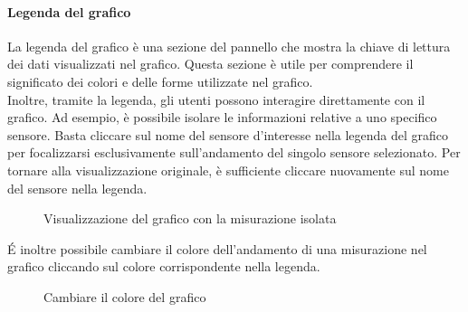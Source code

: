 \paragraph{Legenda del grafico}
La legenda del grafico è una sezione del pannello che mostra la chiave di lettura dei dati visualizzati nel grafico. Questa sezione è utile per comprendere il significato dei colori e delle forme utilizzate nel grafico.\\
Inoltre, tramite la legenda, gli utenti possono interagire direttamente con il grafico. Ad esempio, è possibile isolare le informazioni relative a uno specifico sensore. Basta cliccare sul nome del sensore d'interesse nella legenda del grafico per focalizzarsi esclusivamente sull'andamento del singolo sensore selezionato. Per tornare alla visualizzazione originale, è sufficiente cliccare nuovamente sul nome del sensore nella legenda.
\begin{figure}[H]
    \centering
    \caption{Visualizzazione del grafico con la misurazione isolata}
    \label{fig:my_label}
\end{figure}
É inoltre possibile cambiare il colore dell'andamento di una misurazione nel grafico cliccando sul colore corrispondente nella legenda.
\begin{figure}[H]
    \centering
    \caption{Cambiare il colore del grafico}
    \label{fig:my_label}
\end{figure}


